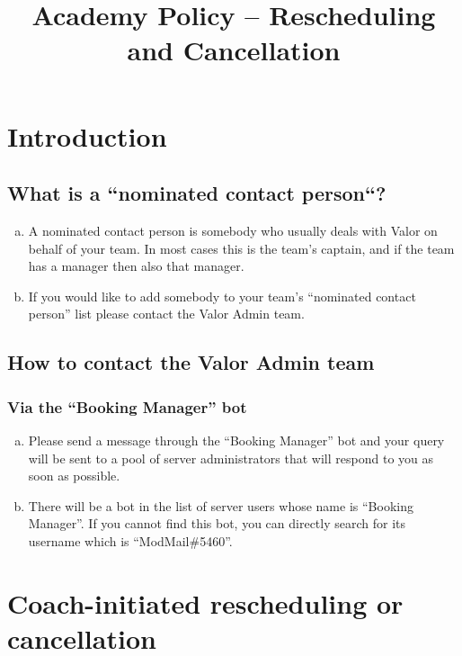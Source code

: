\documentclass[10pt]{article}
\begin{document}
\title{Academy Policy -- Rescheduling and Cancellation}


\section{Introduction}

\subsection{What is a ``nominated contact person``?}
\begin{enumerate}[(a)]
\item
A nominated contact person is somebody who usually deals with Valor on behalf of your team. In most cases this is the team's captain, and if the team has a manager then also that manager.

\item
If you would like to add somebody to your team's ``nominated contact person'' list please contact the Valor Admin team.
\end{enumerate}

\subsection{How to contact the Valor Admin team}
\subsubsection{Via the ``Booking Manager'' bot}
\begin{enumerate}[(a)]
\item
Please send a message through the ``Booking Manager'' bot and your query will be sent to a pool of server administrators that will respond to you as soon as possible.

\item
There will be a bot in the list of server users whose name is ``Booking Manager''. If you cannot find this bot, you can directly search for its username which is \mbox{``ModMail\#5460''}.
\end{enumerate}


\section{Coach-initiated rescheduling or cancellation}
\end{document}
